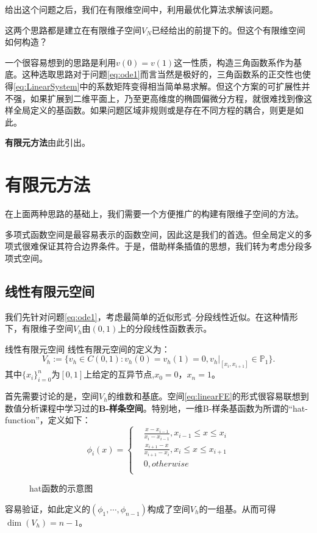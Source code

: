 给出这个问题之后，我们在有限维空间中，利用最优化算法求解该问题。

这两个思路都是建立在有限维子空间$V_{N}$已经给出的前提下的。但这个有限维空间如何构造？

一个很容易想到的思路是利用$v(0)=v(1)$这一性质，构造三角函数系作为基底。这种选取思路对于问题\eqref{eq:ode1}而言当然是极好的，三角函数系的正交性也使得\eqref{eq:LinearSystem}中的系数矩阵变得相当简单易求解。但这个方案的可扩展性并不强，如果扩展到二维平面上，乃至更高维度的椭圆偏微分方程，就很难找到像这样全局定义的基函数。如果问题区域非规则或是存在不同方程的耦合，则更是如此。

\textbf{有限元方法}由此引出。
\section{有限元方法}
在上面两种思路的基础上，我们需要一个方便推广的构建有限维子空间的方法。

多项式函数空间是最容易表示的函数空间，因此这是我们的首选。但全局定义的多项式很难保证其符合边界条件。于是，借助样条插值的思想，我们转为考虑分段多项式空间。

\subsection{线性有限元空间}
我们先针对问题\eqref{eq:ode1}，考虑最简单的近似形式--分段线性近似。在这种情形下，有限维子空间$V_{h}$由$(0,1)$上的分段线性函数表示。
\begin{definition}{线性有限元空间}
  \label{LinearFE}
  线性有限元空间的定义为：
  \begin{equation}
    \label{eq:linearFE}
    V_{h}:=\{v_{h}\in C(0,1):v_{h}(0)=v_{h}(1)=0,v_{h}|_{[x_{i},x_{i+1}]}\in\mathbb{P}_{1}\}.
  \end{equation}
  其中$\{x_{i}\}_{i=0}^{n}$为$[0,1]$上给定的互异节点,$x_{0}=0$，$x_{n}=1$。
\end{definition}
首先需要讨论的是，空间$V_{h}$的维数和基底。空间\eqref{eq:linearFE}的形式很容易联想到数值分析课程中学习过的\textbf{B-样条空间}。特别地，一维B-样条基函数为所谓的“hat-function”，定义如下：
\begin{equation}
  \label{eq:hatfunc}
  \phi_{i}(x)=\left\{
    \begin{aligned}
      &\frac{x-x_{i-1}}{x_{i}-x_{i-1}},x_{i-1}\le x\le x_{i}\\
      &\frac{x_{i+1}-x}{x_{i+1}-x_{i}},x_{i}\le x\le x_{i+1}\\
      & 0,otherwise\\
    \end{aligned}
  \right.
\end{equation}
\begin{figure}[H]
  \centering
  \caption{hat函数的示意图}
\end{figure}
容易验证，如此定义的$(\phi_{1},\cdots,\phi_{n-1})$构成了空间$V_{h}$的一组基。从而可得$\dim(V_{h})=n-1$。
